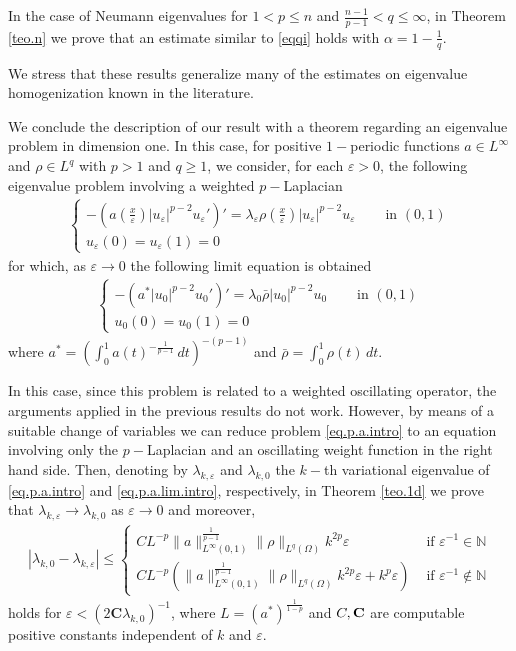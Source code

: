 \documentclass[12pt]{amsart}
\theoremstyle{definition}
\theoremstyle{remark}
\numberwithin{equation}{section}
\begin{document}
In the case of Neumann eigenvalues for $1<p\leq n$ and $\frac{n-1}{p-1}<q\leq \infty$, in  Theorem \ref{teo.n}  we prove that an estimate similar to \eqref{eqqi} holds with $\alpha=1-\frac{1}{q}$.





We stress that these results generalize many of the estimates on eigenvalue homogenization known in the literature. 
 

We conclude the description of our result with a theorem regarding an eigenvalue problem in dimension one. In this case,  for positive $1-$periodic functions $a\in L^\infty$ and $\rho\in L^q$ with $p>1$ and $q\geq 1$, we consider, for each $\varepsilon>0$,  the following eigenvalue problem involving a  weighted $p-$Laplacian 
\begin{align} \label{eq.p.a.intro}
\begin{cases}
-(a(\tfrac{x}{\varepsilon})|u_\varepsilon|^{p-2}u_\varepsilon')'=\lambda_\varepsilon \rho(\tfrac{x}{\varepsilon}) |u_\varepsilon|^{p-2}u_\varepsilon &\quad \text{ in } (0,1)\\
u_\varepsilon(0)=u_\varepsilon(1)=0 
\end{cases}
\end{align}
for which, as $\varepsilon\to 0$ the following limit equation is obtained
\begin{align} \label{eq.p.a.lim.intro}
\begin{cases}
-(a^* | u_0|^{p-2}u_0 ')'=\lambda_0 \bar \rho |u_0|^{p-2}u_0 &\quad \text{ in } (0,1)\\
u_0(0)=u_0(1)=0 
\end{cases}
\end{align}
where $a^* = \left(\int_0^1 a(t)^{-\frac{1}{p-1}}\,dt \right)^{-(p-1)}$ and $\bar \rho=\int_0^1 \rho(t)\,dt$.

In this case, since this problem is related to a  weighted  oscillating operator, the   arguments applied in the previous results do not work. However, by means  of a suitable change of variables we can reduce problem \eqref{eq.p.a.intro} to an equation involving only the $p-$Laplacian and an oscillating weight function in the right hand side. Then, denoting by $\lambda_{k,\varepsilon}$ and $\lambda_{k,0}$ the $k-$th variational eigenvalue of \eqref{eq.p.a.intro} and \eqref{eq.p.a.lim.intro}, respectively, in Theorem \ref{teo.1d}  we prove that $\lambda_{k,\varepsilon} \to \lambda_{k,0}$ as $\varepsilon\to 0$ and moreover, 
\begin{align*}
|\lambda_{k,0}-\lambda_{k,\varepsilon}|\leq 
\begin{cases}
C L^{-p} \|a\|_{L^\infty(0,1)}^\frac{1}{p-1} \|\rho\|_{L^q(\Omega)}  k^{2p}\varepsilon  &\text{ if } \varepsilon^{-1}\in \mathbb N\\
C L^{-p} \left( \|a\|_{L^\infty(0,1)}^\frac{1}{p-1} \|\rho\|_{L^q(\Omega)}   k^{2p}\varepsilon +  k^p \varepsilon \right) &\text{ if } \varepsilon^{-1}\not \in \mathbb N
\end{cases}
\end{align*}
holds for  $\varepsilon<(2\textbf{C} \lambda_{k,0})^{-1}$, where $L=(a^*)^\frac{1}{1-p}$ and $C,{\bf C}$ are computable positive constants  independent of $k$ and $\varepsilon$.
\end{document}
